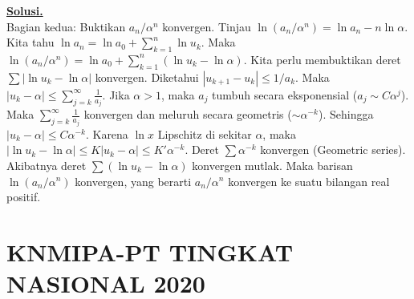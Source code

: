 \documentclass[12pt,twoside]{article}
\newenvironment{solution}
{
	\par\noindent\textbf{\underline{Solusi.}}\\
}
{
	\par
}
\begin{document}
\begin{enumerate}
\begin{solution}
          Bagian kedua: Buktikan $a_n / \alpha^n$ konvergen.
          Tinjau $\ln(a_n / \alpha^n) = \ln a_n - n \ln \alpha$.
          Kita tahu $\ln a_n = \ln a_0 + \sum_{k=1}^n \ln u_k$.
          Maka $\ln(a_n / \alpha^n) = \ln a_0 + \sum_{k=1}^n (\ln u_k - \ln \alpha)$.
          Kita perlu membuktikan deret $\sum |\ln u_k - \ln \alpha|$ konvergen.
          Diketahui $|u_{k+1} - u_k| \le 1/a_k$.
          Maka $|u_k - \alpha| \le \sum_{j=k}^\infty \frac{1}{a_j}$.
          Jika $\alpha > 1$, maka $a_j$ tumbuh secara eksponensial ($a_j \sim C \alpha^j$).
          Maka $\sum_{j=k}^\infty \frac{1}{a_j}$ konvergen dan meluruh secara geometris ($\sim \alpha^{-k}$).
          Sehingga $|u_k - \alpha| \le C \alpha^{-k}$.
          Karena $\ln x$ Lipschitz di sekitar $\alpha$, maka $|\ln u_k - \ln \alpha| \le K |u_k - \alpha| \le K' \alpha^{-k}$.
          Deret $\sum \alpha^{-k}$ konvergen (Geometric series).
          Akibatnya deret $\sum (\ln u_k - \ln \alpha)$ konvergen mutlak.
          Maka barisan $\ln(a_n / \alpha^n)$ konvergen, yang berarti $a_n / \alpha^n$ konvergen ke suatu bilangan real positif.
        \end{solution}
\end{enumerate}

\pagebreak

\section{KNMIPA-PT TINGKAT NASIONAL 2020}
\end{document}
